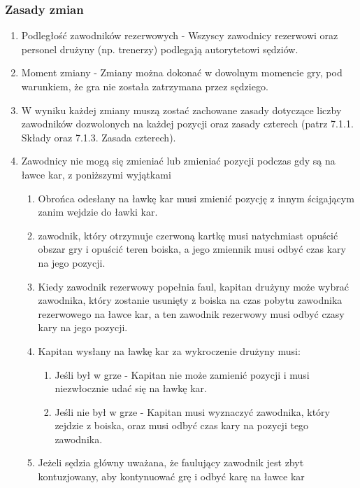 \documentclass[12pt]{article}
\begin{document}
\subsubsection{Zasady zmian}

\begin{enumerate}
\item
  Podległość zawodników rezerwowych - Wszyscy zawodnicy
  rezerwowi oraz personel drużyny (np. trenerzy) podlegają autorytetowi
  sędziów.
\item
  Moment zmiany - Zmiany można dokonać w dowolnym momencie gry,
  pod warunkiem, że gra nie została zatrzymana przez sędziego.
\item
  W wyniku każdej zmiany muszą zostać zachowane zasady dotyczące liczby
  zawodników dozwolonych na każdej pozycji oraz zasady czterech (patrz
  7.1.1. Składy oraz 7.1.3. Zasada czterech).
\item
    Zawodnicy nie mogą się zmieniać lub zmieniać pozycji podczas gdy są na
  ławce kar, z poniższymi wyjątkami
  
  \begin{enumerate}
  \item
        Obrońca odesłany na ławkę kar musi zmienić pozycję z innym
    ścigającym zanim wejdzie do ławki kar.
      \item
        zawodnik, który otrzymuje czerwoną kartkę musi natychmiast opuścić
    obszar gry i opuścić teren boiska, a jego zmiennik musi odbyć czas
    kary na jego pozycji.
      \item
        Kiedy zawodnik rezerwowy popełnia faul, kapitan drużyny może wybrać
    zawodnika, który zostanie usunięty z boiska na czas pobytu zawodnika
    rezerwowego na ławce kar, a ten zawodnik rezerwowy musi odbyć czasy
    kary na jego pozycji.
      \item
        Kapitan wysłany na ławkę kar za wykroczenie drużyny musi:
    
    \begin{enumerate}
    \item
            Jeśli był w grze - Kapitan nie może zamienić pozycji i musi
      niezwłocznie udać się na ławkę kar.
          \item
            Jeśli nie był w grze - Kapitan musi wyznaczyć zawodnika, który
      zejdzie z boiska, oraz musi odbyć czas kary na pozycji tego
      zawodnika.
          \end{enumerate}
  \item
        Jeżeli sędzia główny uważana, że faulujący zawodnik jest zbyt
    kontuzjowany, aby kontynuować grę i odbyć karę na ławce kar
    

\end{enumerate}
\end{enumerate}
\end{document}

